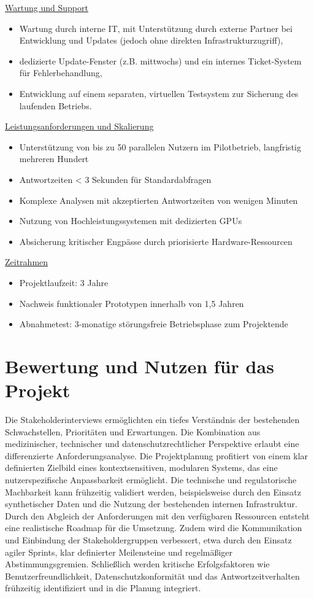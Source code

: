 \underline{Wartung und Support}
\begin{itemize}
	\item Wartung durch interne IT, mit Unterstützung durch externe Partner bei Entwicklung und Updates (jedoch ohne direkten Infrastrukturzugriff),
	\item dedizierte Update-Fenster (z.B. mittwochs) und ein internes Ticket-System für Fehlerbehandlung,
	\item Entwicklung auf einem separaten, virtuellen Testsystem zur Sicherung des laufenden Betriebs.
\end{itemize}
\underline{Leistungsanforderungen und Skalierung}
\begin{itemize}
	\item Unterstützung von bis zu 50 parallelen Nutzern im Pilotbetrieb, langfristig mehreren Hundert
	\item Antwortzeiten < 3 Sekunden für Standardabfragen
	\item Komplexe Analysen mit akzeptierten Antwortzeiten von wenigen Minuten
	\item Nutzung von Hochleistungssystemen mit dedizierten GPUs
	\item Absicherung kritischer Engpässe durch priorisierte Hardware-Ressourcen
\end{itemize}
\underline{Zeitrahmen}
\begin{itemize}
	\item Projektlaufzeit: 3 Jahre
	\item Nachweis funktionaler Prototypen innerhalb von 1,5 Jahren
	\item Abnahmetest: 3-monatige störungsfreie Betriebsphase zum Projektende
\end{itemize}
\section{Bewertung und Nutzen für das Projekt}
Die Stakeholderinterviews ermöglichten ein tiefes Verständnis der bestehenden Schwachstellen, Prioritäten und Erwartungen. Die Kombination aus medizinischer, technischer und datenschutzrechtlicher Perspektive erlaubt eine differenzierte Anforderungsanalyse.
Die Projektplanung profitiert von einem klar definierten Zielbild eines kontextsensitiven, modularen Systems, das eine nutzerspezifische Anpassbarkeit ermöglicht. Die technische und regulatorische Machbarkeit kann frühzeitig validiert werden, beispielsweise durch den Einsatz synthetischer Daten und die Nutzung der bestehenden internen Infrastruktur. Durch den Abgleich der Anforderungen mit den verfügbaren Ressourcen entsteht eine realistische Roadmap für die Umsetzung. Zudem wird die Kommunikation und Einbindung der Stakeholdergruppen verbessert, etwa durch den Einsatz agiler Sprints, klar definierter Meilensteine und regelmäßiger Abstimmungsgremien. Schließlich werden kritische Erfolgsfaktoren wie Benutzerfreundlichkeit, Datenschutzkonformität und das Antwortzeitverhalten frühzeitig identifiziert und in die Planung integriert.


